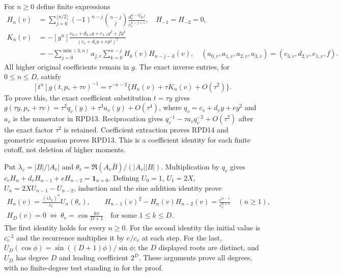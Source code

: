 \documentclass[11pt]{article}
\begin{document}
For $n\ge0$ define finite expressions
\[
 \begin{aligned}
 H_n(v)&=\sum_{j=0}^{\lfloor n/2\rfloor}(-1)^{n-j}\binom{n-j}{j}
      \frac{d_v^{n-2j}e^j}{c_v^{n-j+1}},\quad H_{-1}=H_{-2}=0,\\
 K_n(v)&=-[y^n]\frac{c_{3,v}+d_{2,v}y+e_{1,v}y^2+fy^3}
                            {(c_v+d_vy+ey^2)^2}\\
 &=-\sum_{j=0}^{\min(3,n)}a_{j,v}\sum_{k=0}^{n-j}H_k(v)H_{n-j-k}(v),\quad
 (a_{0,v},a_{1,v},a_{2,v},a_{3,v})=(c_{3,v},d_{2,v},e_{1,v},f).
 \end{aligned}\tag{RPD13}
\]
All higher original coefficients remain in $g$.  The exact inverse
entries, for $0\le n\le D$, satisfy
\[
 [t^n]g(t,p_*+\tau v)^{-1}
   =\tau^{-n-2}\{H_n(v)+\tau K_n(v)+O(\tau^2)\}.\tag{RPD14}
\]
To prove this, the exact coefficient substitution $t=\tau y$ gives
$g(\tau y,p_*+\tau v)=\tau^2q_v(y)+\tau^3a_v(y)+O(\tau^4)$,
where $q_v=c_v+d_vy+ey^2$ and $a_v$ is the numerator in RPD13.
Reciprocation gives $q_v^{-1}-\tau a_vq_v^{-2}+O(\tau^2)$ after
the exact factor $\tau^2$ is retained.  Coefficient extraction
proves RPD14 and geometric expansion proves RPD13.  This is a
coefficient identity for each finite cutoff, not deletion of higher
moments.

Put $\lambda_v=|B|/|A_v|$ and
$\theta_v=\Re(A_v\bar B)/(|A_v||B|)$.  Multiplication by $q_v$
gives $c_vH_n+d_vH_{n-1}+eH_{n-2}=\boldsymbol1_{n=0}$.
Defining $U_0=1$, $U_1=2X$, $U_n=2XU_{n-1}-U_{n-2}$, induction
and the sine addition identity prove
\[
 \begin{gathered}
 H_n(v)=\frac{(i\lambda_v)^n}{c_v}U_n(\theta_v),\qquad
 H_{n-1}(v)^2-H_n(v)H_{n-2}(v)=\frac{e^{n-1}}{c_v^{n+1}}
          \quad(n\ge1),\\
 H_D(v)=0\ \Longleftrightarrow\
 \theta_v=\cos\frac{k\pi}{D+1}\quad\text{for some }1\le k\le D.
 \end{gathered}
 \tag{RPD15}
\]
The first identity holds for every $n\ge0$.
For the second identity the initial value is $c_v^{-2}$ and the
recurrence multiplies it by $e/c_v$ at each step.  For the last,
$U_D(\cos\phi)=\sin((D+1)\phi)/\sin\phi$; the $D$ displayed
roots are distinct, and $U_D$ has degree $D$ and leading coefficient
$2^D$.  These arguments prove all degrees, with no finite-degree
test standing in for the proof.
\end{document}
